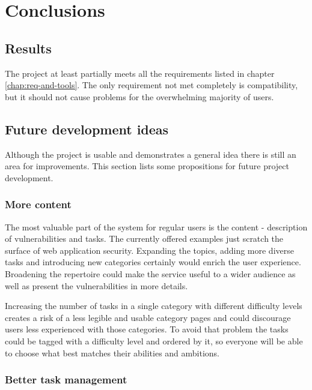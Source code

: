 \chapter{Conclusions}

\section{Results}

The project at least partially meets all the requirements listed in chapter \ref{chap:req-and-tools}. The only requirement not met completely is compatibility, but it should not cause problems for the overwhelming majority of users.

\section{Future development ideas}

Although the project is usable and demonstrates a general idea there is still an area for improvements. This section lists some propositions for future project development.

\subsection{More content}

The most valuable part of the system for regular users is the content - description of vulnerabilities and tasks. The currently offered examples just scratch the surface of web application security. Expanding the topics, adding more diverse tasks and introducing new categories certainly would enrich the user experience. Broadening the repertoire could make the service useful to a wider audience as well as present the vulnerabilities in more details.

Increasing the number of tasks in a single category with different difficulty levels creates a risk of a less legible and usable category pages and could discourage users less experienced with those categories. To avoid that problem the tasks could be tagged with a difficulty level and ordered by it, so everyone will be able to choose what best matches their abilities and ambitions.

\subsection{Better task management}

